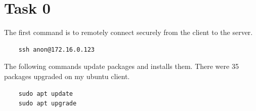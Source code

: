 \documentclass{article}
\begin{document}


\newpage
\section{Task 0}
The first command is to remotely connect securely from the client to the server.

\begin{verbatim}
	ssh anon@172.16.0.123
\end{verbatim}
	
The following commands update packages and installs them. There were 35 packages upgraded on my ubuntu client.

\begin{verbatim}
	sudo apt update
	sudo apt upgrade
\end{verbatim}

\end{document}
